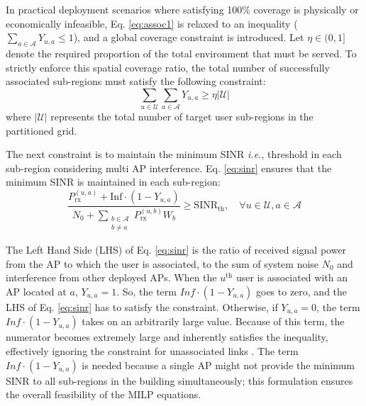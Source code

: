 \documentclass[conference]{IEEEtran}
\begin{document}
In practical deployment scenarios where satisfying 100\% coverage is physically or economically infeasible, Eq. \eqref{eq:assoc1} is relaxed to an inequality ($\sum_{a \in \mathcal{A}} Y_{u,a} \le 1$), and a global coverage constraint is introduced. Let $\eta \in (0,1]$ denote the required proportion of the total environment that must be served. To strictly enforce this spatial coverage ratio, the total number of successfully associated sub-regions must satisfy the following constraint:
\begin{equation}
    \sum_{u \in \mathcal{U}} \sum_{a \in \mathcal{A}} Y_{u,a} \ge \eta |\mathcal{U}|
    \label{eq:coverage_constraint}
\end{equation}
where $|\mathcal{U}|$ represents the total number of target user sub-regions in the partitioned grid.

The next constraint is to maintain the minimum SINR \textit{i.e.}, threshold in each sub-region considering multi AP interference. Eq. \eqref{eq:sinr} ensures that the minimum SINR is maintained in each sub-region:
\begin{equation}
    \frac{P_{\text{rx}}^{(u,a)} + \text{Inf} \cdot (1 - Y_{u,a})}{N_0 + \sum_{\substack{b \in \mathcal{A} \\ b \ne a}} P_{\text{rx}}^{(u,b)} W_b} \ge \text{SINR}_{\text{th}}, \quad \forall u \in \mathcal{U}, a \in \mathcal{A}
    \label{eq:sinr}
\end{equation}

The Left Hand Side (LHS) of Eq. \eqref{eq:sinr} is the ratio of received signal power from the AP to which the user is associated, to the sum of system noise $N_0$ and interference from other deployed APs. When the $u^{\text{th}}$ user is associated with an AP located at $a$, $Y_{u,a} = 1$. So, the term $\textit{Inf} \cdot (1 - Y_{u,a})$ goes to zero, and the LHS of Eq. \eqref{eq:sinr} has to satisfy the constraint. Otherwise, if $Y_{u,a} = 0$, the term $\textit{Inf} \cdot (1 - Y_{u,a})$ takes on an arbitrarily large value. Because of this term, the numerator becomes extremely large and inherently satisfies the inequality, effectively ignoring the constraint for unassociated links \cite{b4}. The term $\textit{Inf} \cdot (1 - Y_{u,a})$ is needed because a single AP might not provide the minimum SINR to all sub-regions in the building simultaneously; this formulation ensures the overall feasibility of the MILP equations. 
\end{document}
